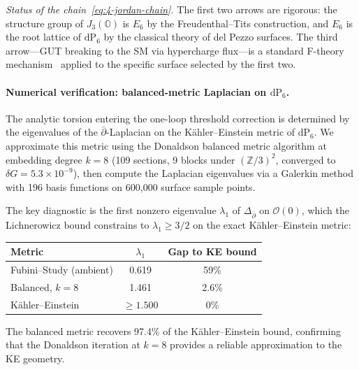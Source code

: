 \emph{Status of the chain~\eqref{eq:4-jordan-chain}.} The first two arrows are rigorous: the structure group of $J_3(\mathbb{O})$ is $E_6$ by the Freudenthal--Tits construction, and $E_6$ is the root lattice of $\mathrm{dP}_6$ by the classical theory of del Pezzo surfaces. The third arrow---GUT breaking to the SM via hypercharge flux---is a standard F-theory mechanism~\cite{ch4:BHV2008a,ch4:BHV2008b} applied to the specific surface selected by the first two.

\paragraph{Numerical verification: balanced-metric Laplacian on $\mathrm{dP}_6$.}
\label{sec:4-torsion-numerics}
The analytic torsion entering the one-loop threshold correction is determined by the eigenvalues of the $\bar\partial$-Laplacian on the K\"ahler--Einstein metric of $\mathrm{dP}_6$.  We approximate this metric using the Donaldson balanced metric algorithm at embedding degree $k = 8$ (109 sections, 9 blocks under $(\mathbb{Z}/3)^2$, converged to $\delta G = 5.3 \times 10^{-9}$), then compute the Laplacian eigenvalues via a Galerkin method with 196 basis functions on 600{,}000 surface sample points.

The key diagnostic is the first nonzero eigenvalue $\lambda_1$ of $\Delta_{\bar\partial}$ on $\mathcal{O}(0)$, which the Lichnerowicz bound constrains to $\lambda_1 \geq 3/2$ on the exact K\"ahler--Einstein metric:
\begin{center}
\begin{tabular}{@{}lcc@{}}
\toprule
Metric & $\lambda_1$ & Gap to KE bound \\
\midrule
Fubini--Study (ambient) & 0.619 & 59\% \\
Balanced, $k = 8$ & 1.461 & 2.6\% \\
K\"ahler--Einstein & $\geq 1.500$ & 0\% \\
\bottomrule
\end{tabular}
\end{center}
The balanced metric recovers 97.4\% of the K\"ahler--Einstein bound, confirming that the Donaldson iteration at $k = 8$ provides a reliable approximation to the KE geometry.

